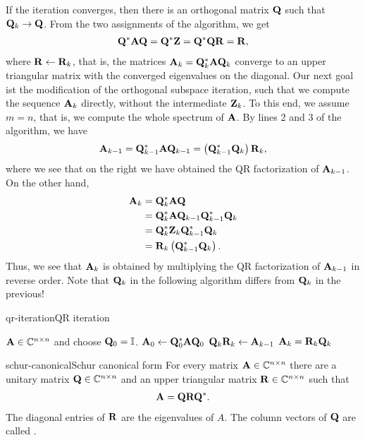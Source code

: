 \begin{remark}
  If the iteration converges, then there is an orthogonal matrix $\mathbf Q$ such that $\mathbf Q_k\to \mathbf Q$.
  From the two assignments of the algorithm, we get
  \begin{gather}
    \mathbf Q^* \mathbf A \mathbf Q = \mathbf Q^* \mathbf Z = \mathbf Q^*\mathbf Q\mathbf R = \mathbf R,
  \end{gather}
  where $\mathbf R\leftarrow\mathbf R_k$, that is, the matrices
  $\mathbf A_k = \mathbf Q_k^*\mathbf A\mathbf Q_k$ converge to an upper triangular
  matrix with the converged eigenvalues on the diagonal. Our next goal
  ist the modification of the orthogonal subspace iteration, such that
  we compute the sequence $\mathbf A_k$ directly, without the intermediate
  $\mathbf Z_k$. To this end, we assume $m=n$, that is, we compute the
  whole spectrum of $\mathbf A$. By lines 2 and 3 of the algorithm, we have
  \begin{gather*}
    \mathbf A_{k-1} = \mathbf Q_{k-1}^*\mathbf A\mathbf Q_{k-1} = \left(\mathbf Q_{k-1}^*\mathbf Q_{k}\right)\mathbf R_k,
  \end{gather*}
  where we see that on the right we have obtained the QR factorization of $\mathbf A_{k-1}$.
  On the other hand,
  \begin{align*}
    \mathbf A_k
    &= \mathbf Q_k^*\mathbf A\mathbf Q\\
    &= \mathbf Q_k^*\mathbf A\mathbf Q_{k-1}\mathbf Q_{k-1}^*\mathbf Q_k\\
    &= \mathbf Q_k^*\mathbf Z_k\mathbf Q_{k-1}^*\mathbf Q_k\\
    &= \mathbf R_k \left(\mathbf Q_{k-1}^*\mathbf Q_k\right).
  \end{align*}
  Thus, we see that $\mathbf A_k$ is obtained by multiplying the QR
  factorization of $\mathbf A_{k-1}$ in reverse order. Note that $\mathbf Q_k$
  in the following algorithm differs from $\mathbf Q_k$ in the previous!
\end{remark}

\begin{Algorithm*}{qr-iteration}{QR iteration}
  \begin{algorithmic}[1]
    \Require $\mathbf A\in\mathbb C^{n\times n}$ and choose $\mathbf Q_0 = \mathbb I$.
    \State $\mathbf A_0 \gets \mathbf Q_0^*\mathbf A\mathbf Q_0$
    \State $\mathbf Q_k\mathbf R_k \gets \mathbf A_{k-1}$ 
    \State $\mathbf A_{k} = \mathbf R_k\mathbf Q_k$
    \EndFor
  \end{algorithmic}
\end{Algorithm*}

\begin{Theorem*}{schur-canonical}{Schur canonical form}
  For every matrix $\mathbf A\in\mathbb C^{n\times n}$ there are a unitary matrix
  $\mathbf Q\in\mathbb C^{n\times n}$ and an upper triangular matrix $\mathbf R\in\mathbb C^{n\times n}$ such
  that
  \begin{gather}
    \mathbf A = \mathbf Q \mathbf R \mathbf Q^*.
  \end{gather}
  The diagonal entries of $\mathbf R$ are the eigenvalues of $A$. The
  column vectors of $\mathbf Q$ are called .
\end{Theorem*}

